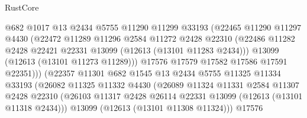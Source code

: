 \begin{lexlean}{RustCore}
\begin{coremodule}
                              @682
                              @1017
                              @13
                              @2434
                              @5755
                              @11290
                              @11299
                              @33193
                              (@22465
                                @11290
                                @11297
                                @4430
                                (@22472
                                  @11289
                                  @11296
                                  @2584
                                  @11272
                                  @2428
                                  @22310
                                  (@22486
                                    @11282
                                    @2428
                                    @22421
                                    @22331
                                    @13099
                                    (@12613 (@13101 @11283 @2434)))
                                  @13099
                                  (@12613 (@13101 @11273 @11289)))
                                @17576
                                @17579
                                @17582
                                @17586
                                @17591
                                @22351)))
                          (@22357
                            @11301
                            @682
                            @1545
                            @13
                            @2434
                            @5755
                            @11325
                            @11334
                            @33193
                            (@26082
                              @11325
                              @11332
                              @4430
                              (@26089
                                @11324
                                @11331
                                @2584
                                @11307
                                @2428
                                @22310
                                (@26103
                                  @11317
                                  @2428
                                  @26114
                                  @22331
                                  @13099
                                  (@12613 (@13101 @11318 @2434)))
                                @13099
                                (@12613 (@13101 @11308 @11324)))
                              @17576

\end{coremodule}
\end{lexlean}

